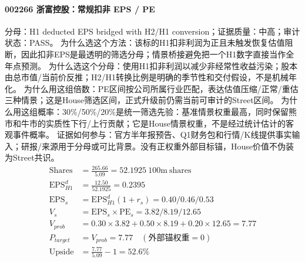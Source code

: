 \paragraph{002266 浙富控股：常规扣非 EPS / PE}
分母：H1 deducted EPS bridged with H2/H1 conversion；证据质量：中高；审计状态：PASS。
为什么选这个方法：该标的H1扣非利润为正且未触发恢复估值阻断，因此扣非EPS是最透明的筛选分母；情景桥接避免把一个H1数字直接当作全年点预测。
为什么选这个分母：使用H1扣非利润以减少非经常性收益污染；股本由总市值/当前价反推；H2/H1转换比例是明确的季节性和交付假设，不是机械年化。
为什么用这组倍数：PE区间按公司所属行业匹配，表达估值压缩/正常/重估三种情景；这是House筛选区间，正式升级前仍需当前可审计的Street区间。
为什么用这组概率：30\%/50\%/20\%是统一筛选先验：基准情景权重最高，同时保留熊市和牛市的实质性下行/上行贡献；它是House情景权重，不是经过统计估计的客观事件概率。
证据如何参与：官方半年报预告、Q1财务包和行情/K线提供事实输入；研报/来源用于分母或可比背景。没有正权重外部目标锚，House价值不伪装为Street共识。
\begin{align*}
\mathrm{Shares} &= \frac{265.66}{5.09}=52.1925\ \mathrm{100m\ shares}\\
\mathrm{EPS}_{H1}^d &= \frac{12.50}{52.1925}=0.2395\\
\mathrm{EPS}_s &= \mathrm{EPS}_{H1}^d(1+r_s)=0.40/0.46/0.53\\
V_s &= \mathrm{EPS}_s\times \mathrm{PE}_s=3.82/8.19/12.65\\
V_{prob} &= 0.30\times 3.82+0.50\times 8.19+0.20\times 12.65=7.77\\
P_{target} &= V_{prob}=7.77\quad(\text{外部锚权重}=0)\\
\mathrm{Upside} &= \frac{7.77}{5.09}-1=52.6\%\\
\end{align*}

